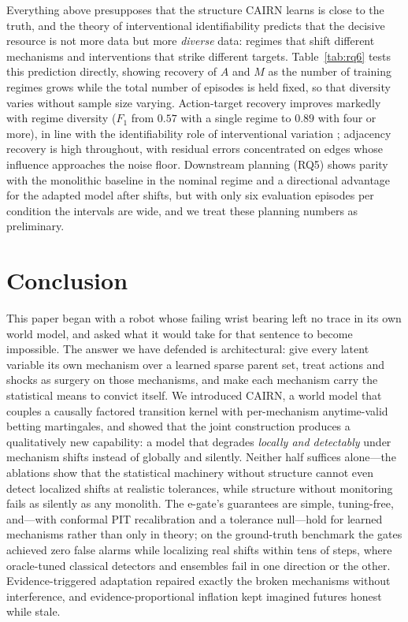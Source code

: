 \documentclass[preprint,12pt]{elsarticle}
\theoremstyle{definition}
\theoremstyle{remark}
\begin{document}
Everything above presupposes that the structure CAIRN learns is close
to the truth, and the theory of interventional identifiability predicts
that the decisive resource is not more data but more \emph{diverse}
data: regimes that shift different mechanisms and interventions that
strike different targets. Table~\ref{tab:rq6} tests this prediction
directly, showing recovery of $A$ and $M$ as the number of training
regimes grows while the total number of episodes is held fixed, so that
diversity varies without sample size varying.
Action-target recovery improves markedly with regime diversity ($F_1$
from $0.57$ with a single regime to $0.89$ with four or more), in line
with the identifiability role of interventional variation
\citep{ahuja2023interventional}; adjacency recovery is high throughout,
with residual errors concentrated on edges whose influence approaches
the noise floor. Downstream planning (RQ5) shows parity with the
monolithic baseline in the nominal regime and a directional advantage
for the adapted model after shifts, but with only six evaluation
episodes per condition the intervals are wide, and we treat these
planning numbers as preliminary.



\section{Conclusion}\label{sec:conclusion}

This paper began with a robot whose failing wrist bearing left no trace
in its own world model, and asked what it would take for that sentence
to become impossible. The answer we have defended is architectural: give
every latent variable its own mechanism over a learned sparse parent
set, treat actions and shocks as surgery on those mechanisms, and make
each mechanism carry the statistical means to convict itself. We
introduced CAIRN, a world model that couples a causally factored
transition kernel with per-mechanism anytime-valid betting martingales,
and showed that the joint construction produces a qualitatively new
capability: a model that degrades \emph{locally and detectably} under
mechanism shifts instead of globally and silently. Neither half suffices
alone---the ablations show that the statistical machinery without
structure cannot even detect localized shifts at realistic tolerances,
while structure without monitoring fails as silently as any monolith. The e-gate's
guarantees are simple, tuning-free, and---with conformal PIT
recalibration and a tolerance null---hold for learned mechanisms rather
than only in theory; on the ground-truth benchmark the gates achieved
zero false alarms while localizing real shifts within tens of steps,
where oracle-tuned classical detectors and ensembles fail in one
direction or the other. Evidence-triggered adaptation repaired exactly
the broken mechanisms without interference, and evidence-proportional
inflation kept imagined futures honest while stale.
\end{document}

